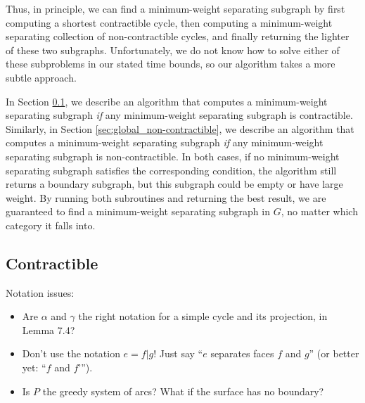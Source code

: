 \documentclass[11pt,twoside]{article}
\begin{document}
{Thus, in principle, we can find a minimum-weight separating subgraph by first computing a shortest contractible cycle, then computing a minimum-weight separating collection of non-contractible cycles, and finally returning the lighter of these two subgraphs.  Unfortunately, we do not know how to solve either of these subproblems in our stated time bounds, so our algorithm takes a more subtle approach. 


In Section \ref{sec:global_contractible}, we describe an algorithm that computes a minimum-weight separating subgraph \emph{if} any minimum-weight separating subgraph is contractible.  Similarly, in Section \ref{sec:global_non-contractible}, we describe an algorithm that computes a minimum-weight separating subgraph \emph{if} any minimum-weight separating subgraph is non-contractible.  In both cases, if no minimum-weight separating subgraph satisfies the corresponding condition, the algorithm still returns a boundary subgraph, but this subgraph could be empty or have large weight.  By running both subroutines and returning the best result, we are guaranteed to find a minimum-weight separating subgraph in $G$, no matter which category it falls into.



\subsection{Contractible}
\label{sec:global_contractible}

 
\begin{TODO}
\noindent
Notation issues:
\begin{itemize}\cramped
\item Are $\alpha$ and $\gamma$ the right notation for a simple cycle and its projection, in Lemma 7.4?
\item Don’t use the notation $e = f|g$!  Just say “$e$ separates faces $f$ and $g$” (or better yet: “$f$ and $f’$”).
\item Is $P$ the greedy system of arcs?  What if the surface has no boundary?
\end{itemize}
\end{TODO}

}
\end{document}
